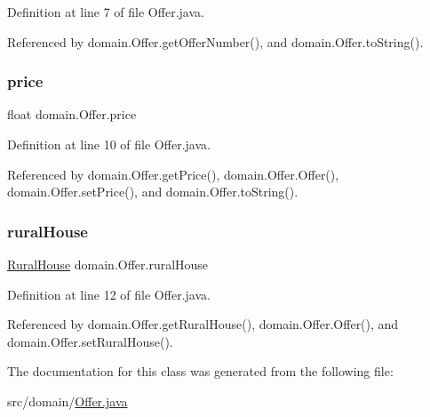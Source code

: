 Definition at line 7 of file Offer.\+java.



Referenced by domain.\+Offer.\+get\+Offer\+Number(), and domain.\+Offer.\+to\+String().

\mbox{\label{classdomain_1_1Offer_a194cfe9363c5bd9e745f56978b03e7fd}} 
\subsubsection{\texorpdfstring{price}{price}}
{\footnotesize\ttfamily float domain.\+Offer.\+price\hspace{0.3cm}{\ttfamily [private]}}



Definition at line 10 of file Offer.\+java.



Referenced by domain.\+Offer.\+get\+Price(), domain.\+Offer.\+Offer(), domain.\+Offer.\+set\+Price(), and domain.\+Offer.\+to\+String().

\mbox{\label{classdomain_1_1Offer_a122573abd92911b25cde7d7e84f488f5}} 
\subsubsection{\texorpdfstring{ruralHouse}{ruralHouse}}
{\footnotesize\ttfamily \mbox{\hyperlink{classdomain_1_1RuralHouse}{Rural\+House}} domain.\+Offer.\+rural\+House\hspace{0.3cm}{\ttfamily [private]}}



Definition at line 12 of file Offer.\+java.



Referenced by domain.\+Offer.\+get\+Rural\+House(), domain.\+Offer.\+Offer(), and domain.\+Offer.\+set\+Rural\+House().



The documentation for this class was generated from the following file\+:\begin{DoxyCompactItemize}
\item 
src/domain/\mbox{\hyperlink{Offer_8java}{Offer.\+java}}\end{DoxyCompactItemize}
